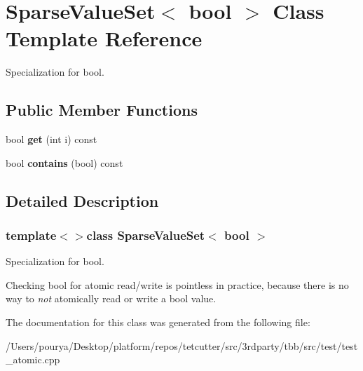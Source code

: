 \hypertarget{classSparseValueSet_3_01bool_01_4}{}\section{Sparse\+Value\+Set$<$ bool $>$ Class Template Reference}
\label{classSparseValueSet_3_01bool_01_4}


Specialization for bool.  


\subsection*{Public Member Functions}
\begin{DoxyCompactItemize}
\item 
\hypertarget{classSparseValueSet_3_01bool_01_4_ad7c626d4a3f0fbd40965b42921b15ec9}{}bool {\bfseries get} (int i) const \label{classSparseValueSet_3_01bool_01_4_ad7c626d4a3f0fbd40965b42921b15ec9}

\item 
\hypertarget{classSparseValueSet_3_01bool_01_4_aef3a62e99102fe0ba81a6e23a064dc95}{}bool {\bfseries contains} (bool) const \label{classSparseValueSet_3_01bool_01_4_aef3a62e99102fe0ba81a6e23a064dc95}

\end{DoxyCompactItemize}


\subsection{Detailed Description}
\subsubsection*{template$<$$>$class Sparse\+Value\+Set$<$ bool $>$}

Specialization for bool. 

Checking bool for atomic read/write is pointless in practice, because there is no way to {\itshape not} atomically read or write a bool value. 

The documentation for this class was generated from the following file\+:\begin{DoxyCompactItemize}
\item 
/\+Users/pourya/\+Desktop/platform/repos/tetcutter/src/3rdparty/tbb/src/test/test\+\_\+atomic.\+cpp\end{DoxyCompactItemize}
